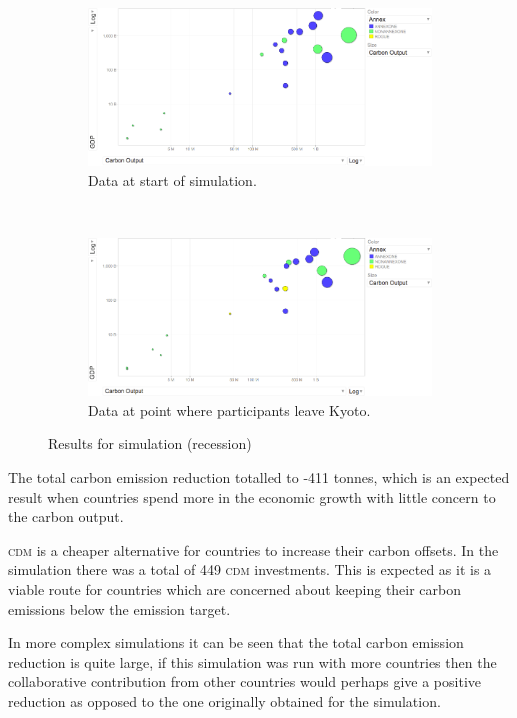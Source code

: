 \begin{figure}[H]
		\centering
        \begin{subfigure}[b]{\textwidth}
                \centering
                \includegraphics[width=\textwidth]{img/simulations/recession-before.png}
				\caption{Data at start of simulation.}
				\label{subfig:recession-1}
        \end{subfigure}
        \\
        \begin{subfigure}[b]{\textwidth}
                \centering
                \includegraphics[width=\textwidth]{img/simulations/recession-after.png}
				\caption{Data at point where participants leave Kyoto.}
				\label{subfig:recession-2}
        \end{subfigure}
        \caption{Results for simulation (recession)}\label{fig:recession}
\end{figure}

The total carbon emission reduction totalled to -411 tonnes, which is an expected result when countries spend more in the economic growth with little concern to the carbon output.

\textsc{cdm} is a cheaper alternative for countries to increase their carbon offsets. In the simulation there was a total of 449 \textsc{cdm} investments. This is expected as it is a viable route for countries which are concerned about keeping their carbon emissions below the emission target.

In more complex simulations it can be seen that the total carbon emission reduction is quite large, if this simulation was run with more countries then the collaborative contribution from other countries would perhaps give a positive reduction as opposed to the one originally obtained for the simulation.
